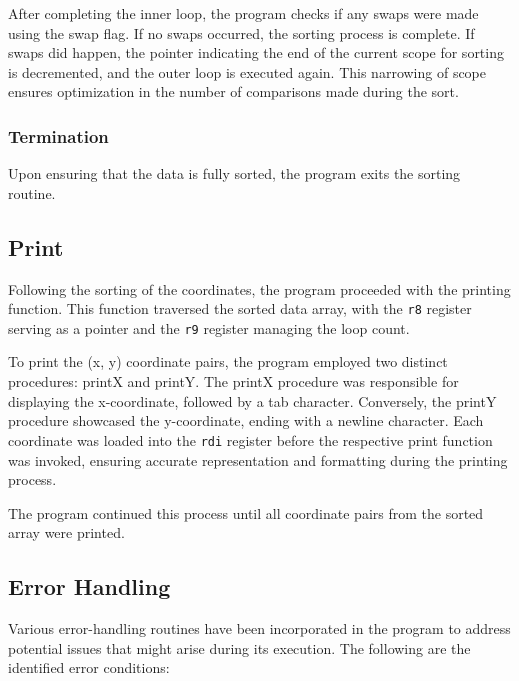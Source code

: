 \documentclass[12pt,a4paper]{article}
\begin{document}
After completing the inner loop, the program checks if any swaps were made using the swap flag. If no swaps occurred, the sorting process is complete. If swaps did happen, the pointer indicating the end of the current scope for sorting is decremented, and the outer loop is executed again. This narrowing of scope ensures optimization in the number of comparisons made during the sort.

\subsubsection{Termination}

Upon ensuring that the data is fully sorted, the program exits the sorting routine.

\subsection{Print}

Following the sorting of the coordinates, the program proceeded with the printing function. This function traversed the sorted data array, with the \texttt{r8} register serving as a pointer and the \texttt{r9} register managing the loop count.

To print the (x, y) coordinate pairs, the program employed two distinct procedures: printX and printY. The printX procedure was responsible for displaying the x-coordinate, followed by a tab character. Conversely, the printY procedure showcased the y-coordinate, ending with a newline character. Each coordinate was loaded into the \texttt{rdi} register before the respective print function was invoked, ensuring accurate representation and formatting during the printing process.

The program continued this process until all coordinate pairs from the sorted array were printed.

\subsection{Error Handling}
Various error-handling routines have been incorporated in the program to address potential issues that might arise during its execution. The following are the identified error conditions:
\end{document}
